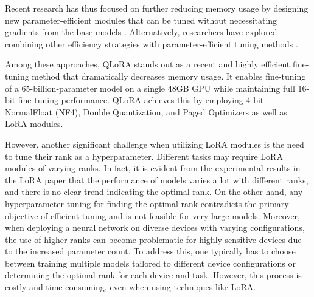 \documentclass[11pt]{article}
\begin{document}
Recent research has thus focused on further reducing memory usage by designing new parameter-efficient modules that can be tuned without necessitating gradients from the base models \cite{sung2022lst}. Alternatively, researchers have explored combining other efficiency strategies with parameter-efficient tuning methods \cite{kwon2022alphatuning, dettmers2023qlora}.

Among these approaches, QLoRA \cite{dettmers2023qlora} stands out as a recent and highly efficient fine-tuning method that dramatically decreases memory usage. It enables fine-tuning of a 65-billion-parameter model on a single 48GB GPU while maintaining full 16-bit fine-tuning performance. QLoRA achieves this by employing 4-bit NormalFloat (NF4), Double Quantization, and Paged Optimizers as well as LoRA modules.

However, another significant challenge when utilizing LoRA modules is the need to tune their rank as a hyperparameter. Different tasks may require LoRA modules of varying ranks. In fact, it is evident from the experimental results in the LoRA paper that the performance of models varies a lot with different ranks, and there is no clear trend indicating the optimal rank. 
On the other hand, any hyperparameter tuning for finding the optimal rank contradicts the primary objective of efficient tuning and is not feasible for very large models. %
Moreover, when deploying a neural network on diverse devices with varying configurations, the use of higher ranks can become problematic for highly sensitive devices due to the increased parameter count. To address this, one typically has to choose between training multiple models tailored to different device configurations or determining the optimal rank for each device and task. However, this process is costly and time-consuming, even when using techniques like LoRA. 
\end{document}
